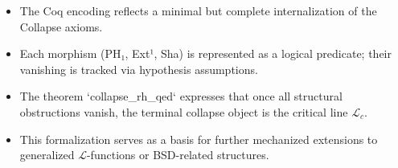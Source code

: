 \documentclass[11pt]{article}
\begin{document}
\begin{itemize}
    \item The Coq encoding reflects a minimal but complete internalization of the Collapse axioms.
    \item Each morphism (PH₁, Ext¹, Sha) is represented as a logical predicate; their vanishing is tracked via hypothesis assumptions.
    \item The theorem `collapse_rh_qed` expresses that once all structural obstructions vanish, the terminal collapse object is the critical line $\mathcal{L}_c$.
    \item This formalization serves as a basis for further mechanized extensions to generalized $\mathcal{L}$-functions or BSD-related structures.
\end{itemize}
\end{document}
